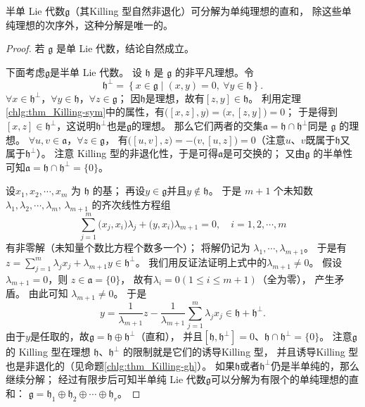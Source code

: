 \begin{theorem}
    半单 Lie 代数$\mathfrak{g}$（其Killing 型自然非退化）可分解为单纯理想的直和，
    除这些单纯理想的次序外，这种分解是唯一的。
\end{theorem}
\begin{proof}
    若 $\mathfrak{g}$ 是单 Lie 代数，结论自然成立。

    下面考虑$\mathfrak{g}$是半单 Lie 代数。
    设 $\mathfrak{h}$ 是 $\mathfrak{g}$ 的非平凡理想。令
    \begin{equation}
        \mathfrak{h}^{\perp}=\left\{x \in \mathfrak{g} \mid (x, y)=0,\ \forall y \in \mathfrak{h}\right\} .
    \end{equation}
    $\forall x \in \mathfrak{h}^{\perp}$，$\forall y \in \mathfrak{h}$，$\forall z \in \mathfrak{g}$；
    因$\mathfrak{h}$是理想，故有$[z, y]\in \mathfrak{h}$。
    利用定理\ref{chlg:thm_Killing-sym}中的属性，有$\bigl([x, z], y\bigr)=\bigl(x,[z, y]\bigr)=0$；
    于是得到$[x, z]\in \mathfrak{h}^\perp$，这说明$\mathfrak{h}^\perp$也是$\mathfrak{g}$的理想。
    那么它们两者的交集$\mathfrak{a}=\mathfrak{h} \cap \mathfrak{h}^{\perp}$同是 $\mathfrak{g}$ 的理想。
    $\forall u, v \in \mathfrak{a}$，$\forall z \in \mathfrak{g}$，
    有$\bigl([u, v], z\bigr)=-\bigl(v,[u, z]\bigr)=0$（注意$u$、$v$既属于$\mathfrak{h}$又
    属于$\mathfrak{h}^{\perp}$）。
    注意 Killing 型的非退化性，于是可得$\mathfrak{a}$是可交换的；
    又由$\mathfrak{g}$ 的半单性可知$\mathfrak{a}=\mathfrak{h} \cap \mathfrak{h}^{\perp}=\{0\}$。

    设$x_1, x_2, \cdots, x_m$ 为 $\mathfrak{h}$ 的基；
    再设$y \in \mathfrak{g}$并且$ y \notin \mathfrak{h}$。
    于是 $m+1$ 个未知数 $\lambda_1, \lambda_2, \cdots, \lambda_m$, $\lambda_{m+1}$ 的齐次线性方程组
    \begin{equation}
        \sum_{j=1}^m \bigl(x_j, x_i\bigr) \lambda_j+ \bigl(y, x_i\bigr) \lambda_{m+1}=0, \quad i=1,2, \cdots, m
    \end{equation}
    有{非零解}（未知量个数比方程个数多一个）；
    将解仍记为 $\lambda_1, \cdots,  \lambda_{m+1}$。
    于是有$z=\sum_{j=1}^m \lambda_j x_j+\lambda_{m+1} y \in \mathfrak{h}^{\perp} $。
    我们用反证法证明上式中的$\lambda_{m+1} \neq 0$。
    假设$\lambda_{m+1}=0$，则 $z \in \mathfrak{a}=\{0\}$，
    故有$\lambda_i=0 (1 \leqslant i \leqslant m+1)$（全为零）， 产生矛盾。
    由此可知 $\lambda_{m+1} \neq 0$。 于是
    \begin{equation}
        y=\frac{1}{\lambda_{m+1}} z-\frac{1}{\lambda_{m+1}} \sum_{j=1}^m \lambda_j x_j \in \mathfrak{h}+\mathfrak{h}^{\perp} .
    \end{equation}
    由于$y$是任取的，故$\mathfrak{g}=\mathfrak{h} \oplus \mathfrak{h}^{\perp}$（直和），
    并且$[\mathfrak{h} , \mathfrak{h}^{\perp}]=0$、$\mathfrak{h} \cap \mathfrak{h}^{\perp}=\{0\}$。
    注意$\mathfrak{g}$ 的 Killing 型在理想 $\mathfrak{h}$、$ \mathfrak{h}^{\perp}$ 的限制就是它们的诱导Killing 型，
    并且诱导Killing 型也是非退化的（见命题\ref{chlg:thm_Killing-gh}）。
    如果$\mathfrak{h}$或者$ \mathfrak{h}^{\perp}$仍是半单纯的，那么继续分解；
    经过有限步后可知半单纯 Lie 代数$\mathfrak{g}$可以分解为有限个的单纯理想的直和：
    $\mathfrak{g}=\mathfrak{h}_1 \oplus \mathfrak{h}_2 \oplus \cdots \oplus \mathfrak{h}_r$。


\end{proof}
